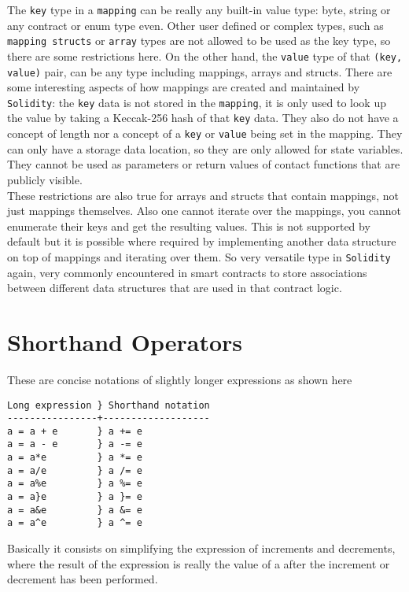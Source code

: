 The \texttt{key} type in a \texttt{mapping} can be really any built-in value type: byte, string or any contract or enum type even. Other user defined or complex types, such as \texttt{mapping structs} or \texttt{array} types are not allowed to be used as the key type, so there are some restrictions here. On the other hand, the \texttt{value} type of that \texttt{(key, value)} pair, can be any type including mappings, arrays and structs. There are some interesting aspects of how mappings are created and maintained by \texttt{Solidity}: the \texttt{key} data is not stored in the \texttt{mapping}, it is only used to look up the value by taking a Keccak-256 hash of that \texttt{key} data. They also do not have a concept of length nor a concept of a \texttt{key} or \texttt{value} being set in the mapping. They can only have a storage data location, so they are only allowed for state variables. They cannot be used as parameters or return values of contact functions that are publicly visible.\\

These restrictions are also true for arrays and structs that contain mappings, not just mappings themselves. Also one cannot iterate over the mappings, you cannot enumerate their keys and get the resulting values. This is not supported by default but it is possible where required by implementing another data structure on top of mappings and iterating over them. So very versatile type in \texttt{Solidity} again, very commonly encountered in smart contracts to store associations between different data structures that are used in that contract logic.

\section{Shorthand Operators}
These are concise notations of slightly longer expressions as shown here

\begin{lstlisting}[style=defaultStyle, caption={Example of shorthand operators}]
Long expression } Shorthand notation
----------------+-------------------
a = a + e       } a += e
a = a - e       } a -= e
a = a*e         } a *= e
a = a/e         } a /= e
a = a%e         } a %= e
a = a}e         } a }= e
a = a&e         } a &= e
a = a^e         } a ^= e
\end{lstlisting}

Basically it consists on simplifying the expression of increments and decrements, where the result of the expression is really the value of a after the increment or decrement has been performed.

